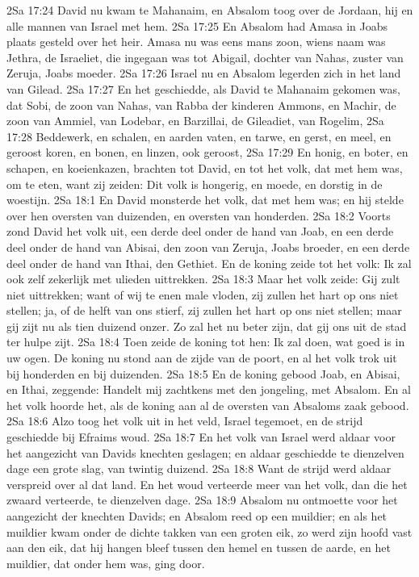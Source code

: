 2Sa 17:24  David nu kwam te Mahanaim, en Absalom toog over de Jordaan, hij en alle mannen van Israel met hem.
2Sa 17:25  En Absalom had Amasa in Joabs plaats gesteld over het heir. Amasa nu was eens mans zoon, wiens naam was Jethra, de Israeliet, die ingegaan was tot Abigail, dochter van Nahas, zuster van Zeruja, Joabs moeder.
2Sa 17:26  Israel nu en Absalom legerden zich in het land van Gilead.
2Sa 17:27  En het geschiedde, als David te Mahanaim gekomen was, dat Sobi, de zoon van Nahas, van Rabba der kinderen Ammons, en Machir, de zoon van Ammiel, van Lodebar, en Barzillai, de Gileadiet, van Rogelim,
2Sa 17:28  Beddewerk, en schalen, en aarden vaten, en tarwe, en gerst, en meel, en geroost koren, en bonen, en linzen, ook geroost,
2Sa 17:29  En honig, en boter, en schapen, en koeienkazen, brachten tot David, en tot het volk, dat met hem was, om te eten, want zij zeiden: Dit volk is hongerig, en moede, en dorstig in de woestijn.
2Sa 18:1  En David monsterde het volk, dat met hem was; en hij stelde over hen oversten van duizenden, en oversten van honderden.
2Sa 18:2  Voorts zond David het volk uit, een derde deel onder de hand van Joab, en een derde deel onder de hand van Abisai, den zoon van Zeruja, Joabs broeder, en een derde deel onder de hand van Ithai, den Gethiet. En de koning zeide tot het volk: Ik zal ook zelf zekerlijk met ulieden uittrekken.
2Sa 18:3  Maar het volk zeide: Gij zult niet uittrekken; want of wij te enen male vloden, zij zullen het hart op ons niet stellen; ja, of de helft van ons stierf, zij zullen het hart op ons niet stellen; maar gij zijt nu als tien duizend onzer. Zo zal het nu beter zijn, dat gij ons uit de stad ter hulpe zijt.
2Sa 18:4  Toen zeide de koning tot hen: Ik zal doen, wat goed is in uw ogen. De koning nu stond aan de zijde van de poort, en al het volk trok uit bij honderden en bij duizenden.
2Sa 18:5  En de koning gebood Joab, en Abisai, en Ithai, zeggende: Handelt mij zachtkens met den jongeling, met Absalom. En al het volk hoorde het, als de koning aan al de oversten van Absaloms zaak gebood.
2Sa 18:6  Alzo toog het volk uit in het veld, Israel tegemoet, en de strijd geschiedde bij Efraims woud.
2Sa 18:7  En het volk van Israel werd aldaar voor het aangezicht van Davids knechten geslagen; en aldaar geschiedde te dienzelven dage een grote slag, van twintig duizend.
2Sa 18:8  Want de strijd werd aldaar verspreid over al dat land. En het woud verteerde meer van het volk, dan die het zwaard verteerde, te dienzelven dage.
2Sa 18:9  Absalom nu ontmoette voor het aangezicht der knechten Davids; en Absalom reed op een muildier; en als het muildier kwam onder de dichte takken van een groten eik, zo werd zijn hoofd vast aan den eik, dat hij hangen bleef tussen den hemel en tussen de aarde, en het muildier, dat onder hem was, ging door.
